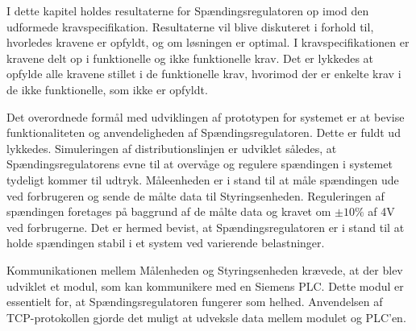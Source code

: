
I dette kapitel holdes resultaterne for Spændingsregulatoren op imod den udformede kravspecifikation. Resultaterne vil blive diskuteret i forhold til, hvorledes kravene er opfyldt, og om løsningen er optimal. I kravspecifikationen er kravene delt op i funktionelle og ikke funktionelle krav. Det er lykkedes at opfylde alle kravene stillet i de funktionelle krav, hvorimod der er enkelte krav i de ikke funktionelle, som ikke er opfyldt. 

Det overordnede formål med udviklingen af prototypen for systemet er at bevise funktionaliteten og anvendeligheden af Spændingsregulatoren. Dette er fuldt ud lykkedes. Simuleringen af distributionslinjen er udviklet således, at Spændingsregulatorens evne til at overvåge og regulere spændingen i systemet tydeligt kommer til udtryk. Måleenheden er i stand til at måle spændingen ude ved forbrugeren og sende de målte data til Styringsenheden. Reguleringen af spændingen foretages på baggrund af de målte data og kravet om $\pm10\%$ af 4V ved forbrugerne. Det er hermed bevist, at Spændingsregulatoren er i stand til at holde spændingen stabil i et system ved varierende belastninger. 



Kommunikationen mellem Målenheden og Styringsenheden krævede, at der blev udviklet et modul, som kan kommunikere med en Siemens PLC. Dette modul er essentielt for, at Spændingsregulatoren fungerer som helhed. Anvendelsen af TCP-protokollen gjorde det muligt at udveksle data mellem modulet og PLC'en. 


